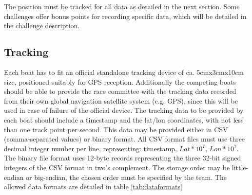 \documentclass[12pt]{article}
\begin{document}
The position must be tracked for all data as detailed in the next section.
Some challenges offer bonus points for recording specific data, which will be
detailed in the challenge description.

\subsection{Tracking}
Each boat has to fit an official standalone tracking device of ca. 5cmx3cmx10cm
size, positioned suitably for GPS reception. Additionally the competing boats
should be able to provide the race committee with the tracking data recorded
from their own global navigation satellite system (e.g. GPS), since this will be
used in case of failure of the official device.
The tracking data to be provided by each boat should include a timestamp and the
lat/lon coordinates, with not less than one track point per second. 
This data may be provided either in CSV (comma-separated values) or binary format.
All CSV format files must use three decimal integer number per line,
representing: timestamp, $Lat*10^7$, $Lon*10^7$.
The binary file format uses 12-byte records representing the three 
32-bit signed integers of the CSV format in two’s complement. The storage order may be
little-endian or big-endian, the chosen order must be specified by the team.
The allowed data formats are detailed in table \ref{tab:dataformats}
\end{document}
